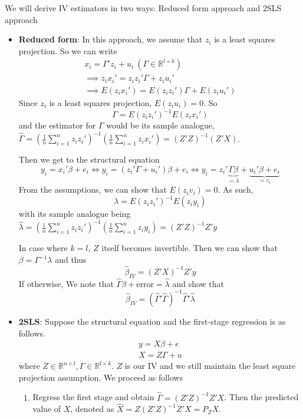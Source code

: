 We will derive IV estimators in two ways: Reduced form approach and 2SLS approach
\begin{itemize}
\item \textbf{Reduced form}: In this approach, we assume that $z_i$ is a least squares projection. So we can write
\begin{gather*}
x_i = \Gamma'z_i+u_i \ (\Gamma\in\mathbb{R}^{l\times k})\\
\implies z_ix_i'=z_iz_i'\Gamma+z_iu_i'\\
\implies E(z_ix_i')=E(z_iz_i')\Gamma+E(z_iu_i')
\end{gather*}
Since $z_i$ is a least squares projection, $E(z_iu_i)=0$. So
\[
\Gamma= E(z_iz_i')^{-1}E(z_ix_i')
\]
and the estimator for $\Gamma$ would be its sample analogue, $\widehat{\Gamma}=\left(\frac{1}{n}\sum_{i=1}^nz_iz_i'\right)^{-1}\left(\frac{1}{n}\sum_{i=1}^nz_ix_i'\right)=(Z'Z)^{-1}(Z'X)$.\par
Then we get to the structural equation 
\[
y_i=x_i'\beta+e_i \iff y_i =(z_i'\Gamma+u_i')\beta+e_i \iff y_i = z_i'\underbrace{\Gamma\beta}_{=\lambda}+\underbrace{u_i'\beta+e_i}_{=v_i}
\]
From the assumptions, we can show that $E(z_iv_i)=0$. As such, 
\[
\lambda=E(z_iz_i')^{-1}E(z_iy_i)
\]
with its sample analogue being $\hat{\lambda}=\left(\frac{1}{n}\sum_{i=1}^n z_iz_i'\right)^{-1} \left(\frac{1}{n}\sum_{i=1}^n z_iy_i\right)=(Z'Z)^{-1}Z'y$\par
In case where $k=l$, $Z$ itself becomes invertible. Then we can show that $\beta=\Gamma^{-1}\lambda$ and thus 
\[
\hat{\beta}_{IV}=(Z'X)^{-1}Z'y
\]
If otherwise, We note that $\widehat{\Gamma}\beta+\text{error}=\hat{\lambda}$ and show that 
\[
\hat{\beta}_{IV}=(\widehat{\Gamma}'\widehat{\Gamma})^{-1}\widehat{\Gamma}'\hat{\lambda}
\]
\item \textbf{2SLS}:  Suppose the structural equation and the first-stage regression is as follows.
\begin{gather*}
y=X\beta+e \tag{Structural}\\
X=Z\Gamma+u \tag{First Stage}
\end{gather*}
where $Z\in\mathbb{R}^{n\times l},\Gamma\in\mathbb{R}^{l\times k}$. $Z$ is our IV and we still maintain the least square projection assumption. We proceed as follows
\begin{enumerate}
\item Regress the first stage and obtain $\widehat{\Gamma}=(Z'Z)^{-1}Z'X$. Then the predicted value of $X$, denoted as $\widehat{X}=Z(Z'Z)^{-1}Z'X=P_ZX$.
\begin{mdframed}[backgroundcolor=green!5] 

\end{mdframed}
\end{enumerate}
\end{itemize}
